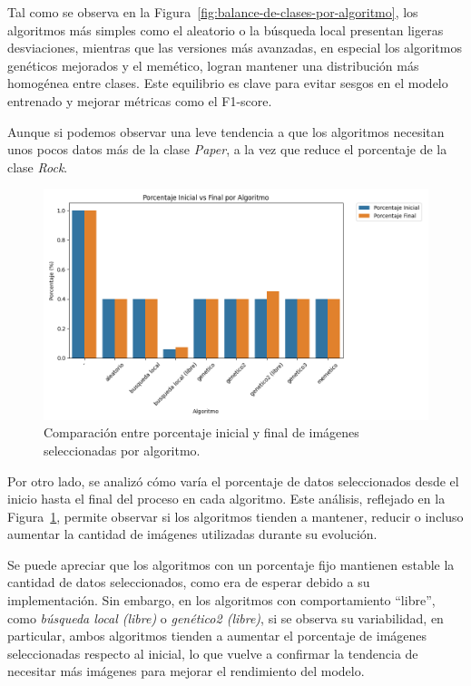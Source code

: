 Tal como se observa en la Figura~\ref{fig:balance-de-clases-por-algoritmo}, los algoritmos más simples como el aleatorio o la búsqueda local presentan ligeras desviaciones, mientras que las versiones más avanzadas, en especial los algoritmos genéticos mejorados y el memético, logran mantener una distribución más homogénea entre clases.
Este equilibrio es clave para evitar sesgos en el modelo entrenado y mejorar métricas como el F1-score.


Aunque si podemos observar una leve tendencia a que los algoritmos necesitan unos pocos datos más de la clase \textit{Paper}, a la vez que reduce el porcentaje de la clase \textit{Rock}.


\begin{figure}[htp]
    \centering
    \includegraphics[width=1\textwidth]{imagenes/mobilenet-BARPLOT-porcentaje-inical-vs-final-por-algoritmo}
    \caption{Comparación entre porcentaje inicial y final de imágenes seleccionadas por algoritmo.
    }
    \label{fig:comparation-initial-final}
\end{figure}

Por otro lado, se analizó cómo varía el porcentaje de datos seleccionados desde el inicio hasta el final del proceso en cada algoritmo.
Este análisis, reflejado en la Figura~\ref{fig:comparation-initial-final}, permite observar si los algoritmos tienden a mantener,
reducir o incluso aumentar la cantidad de imágenes utilizadas durante su evolución.


Se puede apreciar que los algoritmos con un porcentaje fijo mantienen estable la cantidad de datos seleccionados, como era de esperar debido a su implementación.
Sin embargo, en los algoritmos con comportamiento “libre”, como \textit{búsqueda local (libre)} o \textit{genético2 (libre)}, si se observa su variabilidad,
en particular, ambos algoritmos tienden a aumentar el porcentaje de imágenes seleccionadas respecto al inicial,
lo que vuelve a confirmar la tendencia de necesitar más imágenes para mejorar el rendimiento del modelo.


